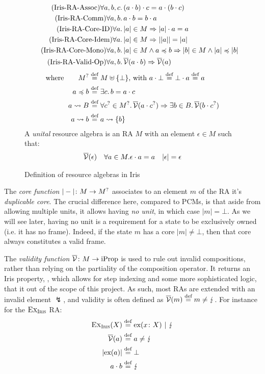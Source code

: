 \begin{figure}
\centering
\begin{align}
	\tag{Iris-RA-Assoc} \forall a,b,c&\ldotp (a\cdot b)\cdot c = a\cdot (b\cdot c)\\
	\tag{Iris-RA-Comm} \forall a,b&\ldotp a\cdot b = b\cdot a\\
	\tag{Iris-RA-Core-ID} \forall a&\ldotp |a| \in M \Rightarrow |a|\cdot a = a\\
	\tag{Iris-RA-Core-Idem} \forall a&\ldotp |a|\in M\Rightarrow ||a|| = |a|\\
	\tag{Iris-RA-Core-Mono} \forall a,b&\ldotp |a|\in M\land a\preccurlyeq b \Rightarrow |b| \in M \land |a| \preccurlyeq |b|\\
	\tag{Iris-RA-Valid-Op} \forall a,b&\ldotp \overline{\cal V}(a\cdot b)\Rightarrow \overline{\cal V}(a)
\end{align}
\begin{align*}
	\text{where}\qquad
	M^? &\stackrel{\textnormal{def}}= M \uplus \{\bot\}\text{, with }a\cdot \bot \stackrel{\textnormal{def}}= \bot\cdot a\stackrel{\textnormal{def}}= a\\
	a \preccurlyeq b &\stackrel{\textnormal{def}}= \exists c\ldotp b = a\cdot c\\
	a \rightsquigarrow B &\stackrel{\textnormal{def}}= \forall c^? \in M^?\ldotp \overline{\cal V}(a\cdot c^?) \Rightarrow \exists b\in B\ldotp \overline{\cal V}(b\cdot c^?)\\
	a \rightsquigarrow b &\stackrel{\textnormal{def}}= a \rightsquigarrow \{b\}
\end{align*}
A \emph{unital} resource algebra is an RA $M$ with an element $\epsilon\in M$ such that:
\begin{align*}
	\overline{\cal V}(\epsilon) &&
	\forall a\in M. \epsilon\cdot a = a&&
	|\epsilon|=\epsilon
\end{align*}
\caption{Definition of resource algebras in Iris}
\label{fig:irisra-properties}
\end{figure}

The \emph{core function} $|-|\colon M\rightarrow M^?$ associates to an element $m$ of the RA it's \emph{duplicable core}. The crucial difference here, compared to PCMs, is that aside from allowing multiple units, it allows having \emph{no unit}, in which case $|m|=\bot$. As we will see later, having no unit is a requirement for a state to be exclusively owned (i.e. it has no frame). Indeed, if the state $m$ has a core $|m|\neq\bot$, then that core always constitutes a valid frame.

The \emph{validity function} $\overline{\cal V}\colon M\rightarrow \text{iProp}$ is used to rule out invalid compositions, rather than relying on the partiality of the composition operator. It returns an Iris property, , which allows for step indexing and some more sophisticated logic, that it out of the scope of this project. As such, most RAs are extended with an invalid element $\lightning$, and validity is often defined as $\overline{\cal V}(m)\stackrel{\textnormal{def}}= m\neq \lightning$. For instance for the $\textsc{Ex}_{\textsc{Iris}}$ RA: \begin{align*}
	\textsc{Ex}_{\textsc{Iris}}(X) &\stackrel{\textnormal{def}}= \text{ex}(x\colon X) ~|~ \lightning \\
	\overline{\cal V}(a) &\stackrel{\textnormal{def}}= a \neq \lightning \\
	|\text{ex}(a)| &\stackrel{\textnormal{def}}= \bot\\
	a \cdot b &\stackrel{\textnormal{def}}= \lightning
\end{align*}

